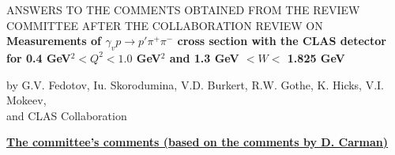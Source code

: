 \documentclass[superscriptaddress,showpacs,amssymb,amsmath,amsfonts,linenumbers,article]{revtex4-1}
\begin{document}
\begin{center}
\vspace{2cm}
{\Large ANSWERS TO THE COMMENTS OBTAINED FROM THE REVIEW COMMITTEE AFTER THE COLLABORATION REVIEW ON}\\[0.7cm]  

{\bf \large
Measurements of $\gamma_{v} p \rightarrow p' \pi^{+} \pi^{-}$ cross section with the CLAS detector for 0.4 GeV$^2 < Q^2 < 1.0$ GeV$^2$ and 1.3 GeV $< W <$ 1.825 GeV \\[0.7cm]}

by G.V. Fedotov, Iu. Skorodumina, V.D. Burkert, R.W. Gothe, K. Hicks, V.I. Mokeev,\\ and CLAS Collaboration\\[1cm]
\end{center}




{\vspace{1cm} \bf \Large \underline{The committee's comments (based on the comments by D. Carman)}}\\[0.5cm]
\end{document}
